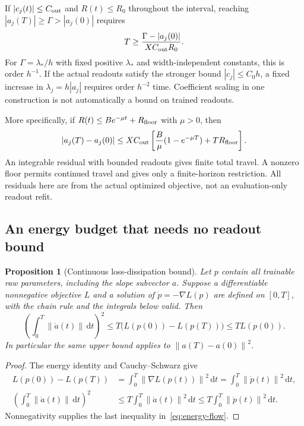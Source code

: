 \documentclass[11pt]{article}
\newtheorem{proposition}{Proposition}[section]
\theoremstyle{remark}
\newcommand{\norm}[1]{\left\lVert #1\right\rVert}
\newcommand{\dd}{\,\mathrm{d}}
\begin{document}
If $|c_j(t)|\leq C_{\rm out}$ and $R(t)\leq R_0$ throughout the interval, reaching $|a_j(T)|\geq\Gamma>|a_j(0)|$ requires
\begin{equation}
 T\geq\frac{\Gamma-|a_j(0)|}{XC_{\rm out}R_0}.
\end{equation}
For $\Gamma=\lambda_*/h$ with fixed positive $\lambda_*$ and width-independent constants, this is order $h^{-1}$. If the actual readouts satisfy the stronger bound $|c_j|\leq C_0h$, a fixed increase in $\lambda_j=h|a_j|$ requires order $h^{-2}$ time. Coefficient scaling in one construction is not automatically a bound on trained readouts.

More specifically, if $R(t)\leq B e^{-\mu t}+R_{\rm floor}$ with $\mu>0$, then
\begin{equation}
 |a_j(T)-a_j(0)|\leq XC_{\rm out}
 \left[\frac{B}{\mu}(1-e^{-\mu T})+TR_{\rm floor}\right].
\end{equation}
An integrable residual with bounded readouts gives finite total travel. A nonzero floor permits continued travel and gives only a finite-horizon restriction. All residuals here are from the actual optimized objective, not an evaluation-only readout refit.

\subsection{An energy budget that needs no readout bound}

\begin{proposition}[Continuous loss-dissipation bound]
Let $p$ contain all trainable raw parameters, including the slope subvector $a$. Suppose a differentiable nonnegative objective $L$ and a solution of $\dot p=-\nabla L(p)$ are defined on $[0,T]$, with the chain rule and the integrals below valid. Then
\begin{equation}
 \left(\int_0^T\norm{\dot a(t)}\dd t\right)^2
 \leq T\bigl(L(p(0))-L(p(T))\bigr)
 \leq TL(p(0)).
 \label{eq:energy-flow}
\end{equation}
In particular the same upper bound applies to $\norm{a(T)-a(0)}^2$.
\end{proposition}
\begin{proof}
The energy identity and Cauchy--Schwarz give
\begin{align}
 L(p(0))-L(p(T))&=\int_0^T\norm{\nabla L(p(t))}^2\dd t
 =\int_0^T\norm{\dot p(t)}^2\dd t,\\
 \left(\int_0^T\norm{\dot a(t)}\dd t\right)^2
 &\leq T\int_0^T\norm{\dot a(t)}^2\dd t
 \leq T\int_0^T\norm{\dot p(t)}^2\dd t.
\end{align}
Nonnegativity supplies the last inequality in~\eqref{eq:energy-flow}.
\end{proof}
\end{document}
